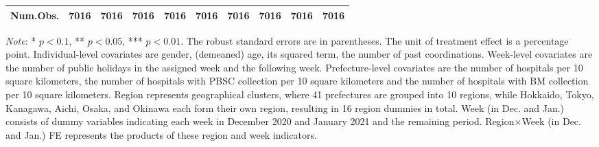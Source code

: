 \documentclass[12pt, a4paper]{article}
\begin{document}
\begin{table}[H]
\begin{threeparttable}
\begin{tabular}[t]{lccccccccc}
Num.Obs. & \num{7016} & \num{7016} & \num{7016} & \num{7016} & \num{7016} & \num{7016} & \num{7016} & \num{7016} & \num{7016}\\
\bottomrule
\end{tabular}
\begin{tablenotes}
\item \emph{Note}: * $p < 0.1$, ** $p < 0.05$, *** $p < 0.01$. The robust standard errors are in parentheses. The unit of treatment effect is a percentage point. Individual-level covariates are gender, (demeaned) age, its squared term, the number of past coordinations. Week-level covariates are the number of public holidays in the assigned week and the following week. Prefecture-level covariates are the number of hospitals per 10 square kilometers, the number of hospitals with PBSC collection per 10 square kilometers and the number of hospitals with BM collection per 10 square kilometers. Region represents geographical clusters, where 41 prefectures are grouped into 10 regions, while Hokkaido, Tokyo, Kanagawa, Aichi, Osaka, and Okinawa each form their own region, resulting in 16 region dummies in total. Week (in Dec. and Jan.) consists of dummy variables indicating each week in December 2020 and January 2021 and the remaining period. Region$\times$Week (in Dec. and Jan.) FE represents the products of these region and week indicators.
\end{tablenotes}
\end{threeparttable}
\end{table}
\end{document}
